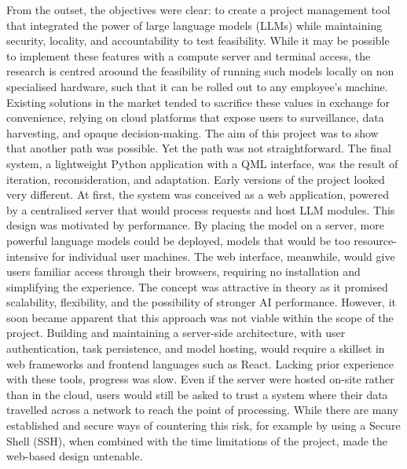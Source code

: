\documentclass{report}
\begin{document}
From the outset, the objectives were clear: to create a project management tool that integrated the power of large language models (LLMs) while maintaining security, locality, and accountability to test feasibility. 
While it may be possible to implement these features with a compute server and terminal access, the research is centred aroound the feasibility of running such models locally on non specialised hardware, such that it can be rolled out to any employee's machine. 
Existing solutions in the market tended to sacrifice these values in exchange for convenience, relying on cloud platforms that expose users to surveillance, data harvesting, and opaque decision-making. 
The aim of this project was to show that another path was possible.
Yet the path was not straightforward. 
The final system, a lightweight Python application with a QML interface, was the result of iteration, reconsideration, and adaptation. 
Early versions of the project looked very different. 
At first, the system was conceived as a web application, powered by a centralised server that would process requests and host LLM modules. 
This design was motivated by performance. 
By placing the model on a server, more powerful language models could be deployed, models that would be too resource-intensive for individual user machines. 
The web interface, meanwhile, would give users familiar access through their browsers, requiring no installation and simplifying the experience.
The concept was attractive in theory as it promised scalability, flexibility, and the possibility of stronger AI performance. 
However, it soon became apparent that this approach was not viable within the scope of the project. 
Building and maintaining a server-side architecture, with user authentication, task persistence, and model hosting, would require a skillset in web frameworks and frontend languages such as React. 
Lacking prior experience with these tools, progress was slow.
Even if the server were hosted on-site rather than in the cloud, users would still be asked to trust a system where their data travelled across a network to reach the point of processing. 
While there are many established and secure ways of countering this risk, for example by using a Secure Shell (SSH), when combined with the time limitations of the project, made the web-based design untenable.
\end{document}
